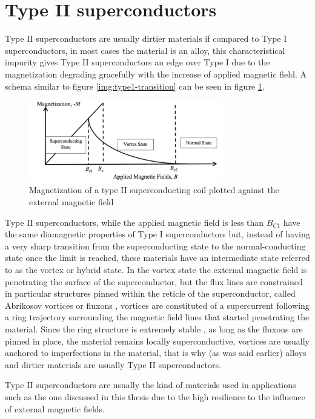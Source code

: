 \section{Type II superconductors}
\label{sec:type2}
Type II superconductors are usually dirtier materials if compared to Type I superconductors, in most
cases the material is an alloy, this characteristical impurity gives Type II superconductors an edge
over Type I due to the magnetization degrading gracefully with the increase of applied magnetic
field. A schema similar to figure \ref{img:type1-transition} can be seen in figure \ref{img:type2-transition}.
\begin{figure}
	\centering
	\includegraphics[width=0.75\textwidth]{./img/type2.png}
	\caption{Magnetization of a type II superconducting coil plotted against the external magnetic field
		\cite{slimani2022superconducting}}
	\label{img:type2-transition}
\end{figure}
Type II superconductors, while the applied magnetic field is less than $B_{C1}$ have the same
diamagnetic properties of Type I superconductors but, instead of having a very sharp transition from the superconducting state to
the normal-conducting state once the limit is reached, these materials have an intermediate state referred to as the vortex or hybrid
state.
In the vortex state the external magnetic field is penetrating the surface of the superconductor, but the
flux lines are constrained in particular structures pinned within the reticle of the
superconductor, called Abrikosov vortices or fluxons \cite{abrikosov-vortices}, vortices are constituted of a supercurrent
following a ring trajectory surrounding the magnetic field lines that started penetrating the
material. Since the ring structure is extremely stable \cite{fujita-theory-HTS}, as long as the
fluxons are pinned in place, the material remains
locally superconductive, vortices are usually anchored to imperfections in the material, that is why
(as was said earlier) alloys and dirtier materials are usually Type II superconductors.

Type II superconductors are usually the kind of materials used in applications such as the one
discussed in this thesis due to the high resilience to the influence of external magnetic fields.

